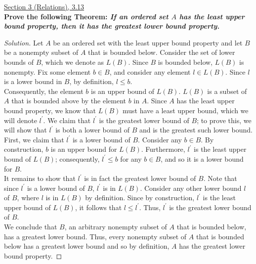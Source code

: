 \documentclass[11pt]{article}
\newenvironment{solution}
  {\renewcommand\qedsymbol{$\blacksquare$}\begin{proof}[Solution]}
  {\end{proof}}
\begin{document}
\newpage

\underline{Section 3 (Relations), 3.13} \\

\textbf{Prove the following Theorem: \textit{If an ordered set $A$ has the least upper bound property, then it has the greatest lower bound property.}}

\begin{solution}
Let $A$ be an ordered set with the least upper bound property and let $B$ be a nonempty subset of $A$ that is bounded below. Consider the set of lower bounds of $B$, which we denote as $L(B)$. Since $B$ is bounded below,
$L(B)$ is nonempty. Fix some element $b \in B$, and consider any element $l \in L(B)$. Since $l$ is a lower bound in $B$, by definition, $l \leq b$. \\

Consequently, the element $b$ is an upper bound of $L(B)$. $L(B)$ is a subset of $A$ that is bounded above by the element $b$ in $A$. Since $A$ has the least upper bound property,
we know that $L(B)$ must have a least upper bound, which we will denote $l^{\prime}$. We claim that $l^{\prime}$ is the greatest lower bound of $B$; to prove this,
we will show that $l^{\prime}$ is both a lower bound of $B$ and is the greatest such lower bound.\\

First, we claim that $l^{\prime}$ is a lower bound of $B$. Consider any $b \in B$. By construction, $b$ is an upper bound for $L(B)$. Furthermore, $l^{\prime}$ is the least upper bound of $L(B)$;
consequently, $l^{\prime} \leq b$ for any $b \in B$, and so it is a lower bound for $B$. \\

It remains to show that $l^{\prime}$ is in fact the greatest lower bound of $B$. Note that since $l^{\prime}$ is a lower bound of $B$, $l^{\prime}$ is in $L(B)$. 
Consider any other lower bound $l$ of $B$, where $l$ is in $L(B)$ by definition.
Since by construction, $l^{\prime}$ is the least upper bound of $L(B)$, it follows that $l \leq l^{\prime}$. Thus, $l^{\prime}$ is the greatest lower bound of $B$. \\

We conclude that $B$, an arbitrary nonempty subset of $A$ that is bounded below, has a greatest lower bound. Thus, every nonempty subset of $A$ that is bounded below has a greatest lower bound
and so by definition, $A$ has the greatest lower bound property. 
\end{solution}
\newpage
\end{document}
